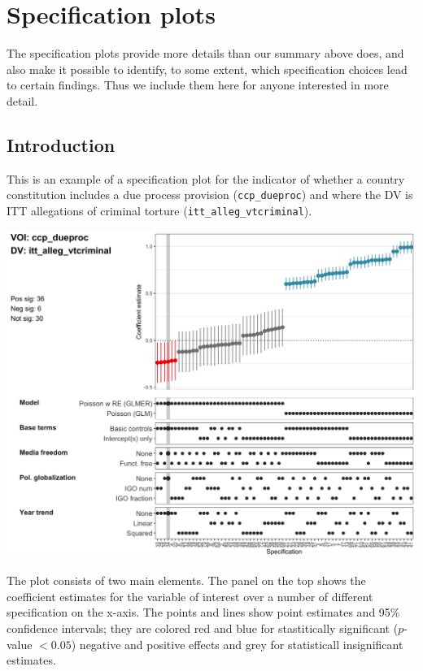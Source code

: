 \documentclass[]{article}
\begin{document}
\clearpage

\hypertarget{specification-plots}{%
\section{Specification plots}\label{specification-plots}}

The specification plots provide more details than our summary above
does, and also make it possible to identify, to some extent, which
specification choices lead to certain findings. Thus we include them
here for anyone interested in more detail.

\hypertarget{introduction}{%
\subsection{Introduction}\label{introduction}}

This is an example of a specification plot for the indicator of whether
a country constitution includes a due process provision
(\texttt{ccp\_dueproc}) and where the DV is ITT allegations of criminal
torture (\texttt{itt\_alleg\_vtcriminal}).

\includegraphics{../output/figures-robustness/specplot-ccp_dueproc-itt_alleg_vtcriminal.png}

The plot consists of two main elements. The panel on the top shows the
coefficient estimates for the variable of interest over a number of
different specification on the x-axis. The points and lines show point
estimates and 95\% confidence intervals; they are colored red and blue
for stastitically significant (\(p\)-value \(< 0.05\)) negative and
positive effects and grey for statisticall insignificant estimates.
\end{document}
